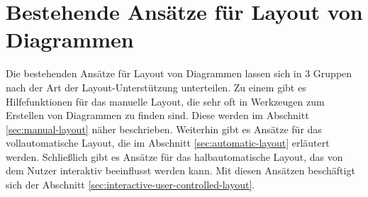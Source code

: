 
\chapter{Bestehende Ansätze für Layout von Diagrammen}

Die bestehenden Ansätze für Layout von Diagrammen lassen sich in 3 Gruppen nach der Art der Layout-Unterstützung unterteilen. Zu einem gibt es Hilfefunktionen für das manuelle Layout, die sehr oft in Werkzeugen zum Erstellen von Diagrammen zu finden sind. Diese werden im Abschnitt \ref{sec:manual-layout} näher beschrieben. Weiterhin gibt es Ansätze für das vollautomatische Layout, die im Abschnitt \ref{sec:automatic-layout} erläutert werden. Schließlich gibt es Ansätze für das halbautomatische Layout, das von dem Nutzer interaktiv beeinflusst werden kann. Mit diesen Ansätzen beschäftigt sich der Abschnitt \ref{sec:interactive-user-controlled-layout}.





